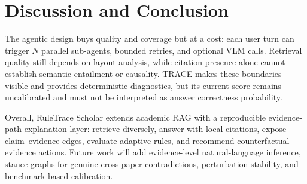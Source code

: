 \documentclass[11pt]{article}
\begin{document}
\vspace{-0.3em}
\section{Discussion and Conclusion}
\vspace{-0.2em}
The agentic design buys quality and coverage but at a cost: each user turn can trigger $N$ parallel sub-agents, bounded retries, and optional VLM calls. Retrieval quality still depends on layout analysis, while citation presence alone cannot establish semantic entailment or causality. TRACE makes these boundaries visible and provides deterministic diagnostics, but its current score remains uncalibrated and must not be interpreted as answer correctness probability.

Overall, RuleTrace Scholar extends academic RAG with a reproducible evidence-path explanation layer: retrieve diversely, answer with local citations, expose claim--evidence edges, evaluate adaptive rules, and recommend counterfactual evidence actions. Future work will add evidence-level natural-language inference, stance graphs for genuine cross-paper contradictions, perturbation stability, and benchmark-based calibration.
\end{document}
